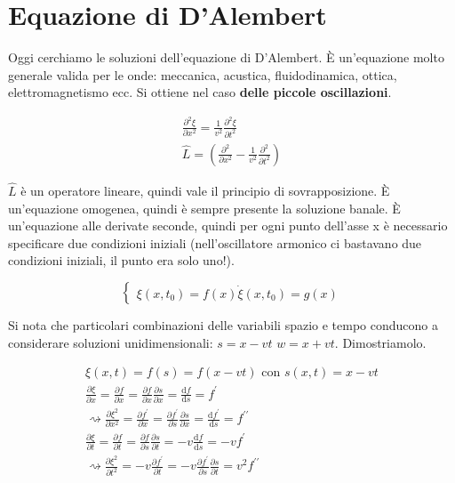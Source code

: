 \section{Equazione di D'Alembert}

Oggi cerchiamo le soluzioni dell'equazione di D'Alembert. È un'equazione molto generale valida per le onde: meccanica, acustica, fluidodinamica, ottica, elettromagnetismo ecc. Si ottiene nel caso \textbf{delle piccole oscillazioni}.

\begin{gather*}
	\frac{\partial ^{2} \xi }{\partial x^{2} } = \frac{1}{v^{2} }\frac{\partial ^{2} \xi }{\partial t ^{2} }\\
	\hat{L} = \left(\frac{\partial ^{2} }{\partial x^{2} } - \frac{1}{v^{2} }\frac{\partial ^{2} }{\partial t ^{2} }\right) 
\end{gather*}

\(\hat{L} \) è un operatore lineare, quindi vale il principio di sovrapposizione. È un'equazione omogenea, quindi è sempre presente la soluzione banale. È un'equazione alle derivate seconde, quindi per ogni punto dell'asse x è necessario specificare due condizioni iniziali (nell'oscillatore armonico ci bastavano due condizioni iniziali, il punto era solo uno!).

\[
	\begin{cases}
		\xi (x, t_0) = f(x)
		\dot{\xi } (x, t_0) = g(x) 
	\end{cases}	
\]

Si nota che particolari combinazioni delle variabili spazio e tempo conducono a considerare soluzioni unidimensionali: \(s=x-vt\) \(w=x+vt\). Dimostriamolo.

\begin{gather*}
	\xi (x,t) = f(s) = f(x-vt) \text{ con } s(x,t)=x-vt\\
	\frac{\partial \xi }{\partial x} = \frac{\partial f}{\partial x} = \frac{\partial f}{\partial x} \frac{\partial s}{\partial x} = \frac{\mathrm{d}f}{\mathrm{d}s} = f^{\prime} \\
	\rightsquigarrow \frac{\partial \xi ^{2} }{\partial x^{2} } = \frac{\partial f^{\prime} }{\partial x} = \frac{\partial f^{\prime} }{\partial s} \frac{\partial s}{\partial x} = \frac{\mathrm{d}f^{\prime} }{\mathrm{d}s} = f^{\prime\prime} \\
	\frac{\partial \xi }{\partial t} = \frac{\partial f}{\partial t} = \frac{\partial f}{\partial s} \frac{\partial s}{\partial t} = -v \frac{\mathrm{d}f}{\mathrm{d}s} = - v f^{\prime} \\
	\rightsquigarrow \frac{\partial \xi ^{2} }{\partial t^{2} } = -v \frac{\partial f^{\prime} }{\partial t}  = - v \frac{\partial f^{\prime} }{\partial s} \frac{\partial s}{\partial t} = v ^{2} f^{\prime\prime} 
\end{gather*}

